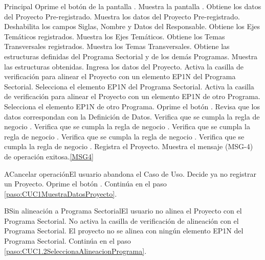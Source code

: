 	\begin{UCtrayectoria}{Principal}
			\UCpaso[\UCactor] Oprime el botón  de la pantalla .
			\UCpaso Muestra la pantalla .
			\UCpaso Obtiene los datos del Proyecto Pre-registrado.
			\UCpaso Muestra los datos del Proyecto Pre-registrado.
			\UCpaso Deshabilita los campos Siglas, Nombre y Datos del Responsable.
			\UCpaso Obtiene los Ejes Temáticos registrados.
			\UCpaso Muestra los Ejes Temáticos.
			\UCpaso Obtiene los Temas Transversales registrados.
			\UCpaso Muestra los Temas Transversales.
			\UCpaso Obtiene las estructuras definidas del Programa Sectorial y de los demás Programas.
			\UCpaso Muestra las estructuras obtenidas.
			\UCpaso [\UCactor] Ingresa los datos del Proyecto.\label{paso:CUC1.2IngresaDatosProyecto} 
			\UCpaso [\UCactor] Activa la casilla de verificación para alinear el Proyecto con un elemento EP1N del Programa Sectorial. 
			\UCpaso [\UCactor] Selecciona el elemento EP1N del Programa Sectorial.
			\UCpaso [\UCactor] Activa la casilla de verificación para alinear el Proyecto con un elemento EP1N de otro Programa.  \label{paso:CUC1.2SeleccionaAlineacionPrograma}
			\UCpaso [\UCactor] Selecciona el elemento EP1N de otro Programa.
			\UCpaso [\UCactor] Oprime el botón .\label{paso:CUC1.2OprimeAceptar}
			\UCpaso Revisa que los datos correspondan con la Definición de Datos. 
			\UCpaso Verifica que se cumpla la regla de negocio .
			\UCpaso Verifica que se cumpla la regla de negocio .
			\UCpaso Verifica que se cumpla la regla de negocio .
			\UCpaso Verifica que se cumpla la regla de negocio . 
			\UCpaso Verifica que se cumpla la regla de negocio . 
			\UCpaso Registra el Proyecto.
			\UCpaso Muestra el mensaje (MSG-4) de operación exitosa.\ref{MSG4}
	\end{UCtrayectoria}

	\begin{UCtrayectoriaA}{A}{Cancelar operación}{El usuario abandona el Caso de Uso.}
			\UCpaso[\UCactor] Decide ya no registrar un Proyecto.
			\UCpaso[\UCactor] Oprime el botón .
			\UCpaso Continúa en el paso \ref{paso:CUC1MuestraDatosProyecto}.
	\end{UCtrayectoriaA}

	\begin{UCtrayectoriaA}{B}{Sin alineación a Programa Sectorial}{El usuario no alinea el Proyecto con el Programa Sectorial.}
			\UCpaso[\UCactor] No activa la casilla de verificación de alineación con el Programa Sectorial.
			\UCpaso El proyecto no se alinea con ningún elemento EP1N del Programa Sectorial.
			\UCpaso Continúa en el paso \ref{paso:CUC1.2SeleccionaAlineacionPrograma}.
	\end{UCtrayectoriaA}

